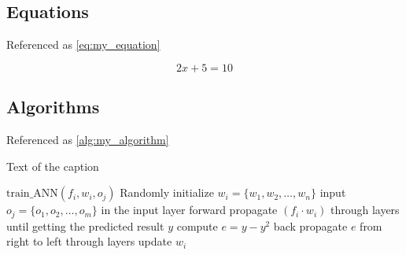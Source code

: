 
\subsection{Equations}
Referenced as \autoref{eq:my_equation}

\begin{equation}
\label{eq:my_equation}
    2x + 5 = 10
\end{equation}


\subsection{Algorithms}
Referenced as \autoref{alg:my_algorithm}

\begin{algorithm}
    \caption{Text of the caption}
    \begin{algorithmic}
    \label{alg:my_algorithm}
        \STATE  $\mathrm{train\_ANN} (f_i,w_i,o_j)$
                \STATE Randomly initialize $w_i=\{w_1,w_2,\dots,w_n\}$
                \STATE input $o_j=\{o_1,o_2,\dots,o_m\}$ in the input layer
                \STATE forward propagate $(f_i\cdot w_i)$ through layers until getting the predicted result $y$
                \STATE compute $e=y-y^2$
                \STATE back propagate $e$ from right to left through layers
                \STATE update $w_i$
            \ENDWHILE
        \ENDFOR
    \end{algorithmic}
\end{algorithm}


 

